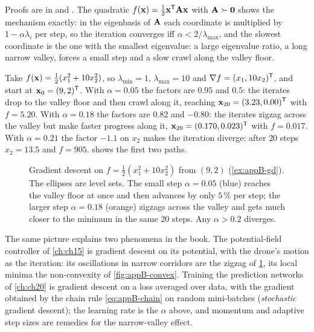 Proofs are in \textcite[Chapter~9]{boyd2004convex} and
\textcite[Chapter~3]{nocedal2006numerical}. The quadratic $f(\mathbf{x}) =
\tfrac12\mathbf{x}^{\mathsf{T}}\mathbf{A}\mathbf{x}$ with $\mathbf{A} \succ \mathbf{0}$ shows the
mechanism exactly: in the eigenbasis of $\mathbf{A}$ each coordinate is
multiplied by $1 - \alpha\lambda_i$ per step, so the iteration converges iff
$\alpha < 2/\lambda_{\max}$, and the slowest coordinate is the one with the
smallest eigenvalue: a large eigenvalue ratio, a long narrow valley, forces a
small step and a slow crawl along the valley floor.

\begin{example}
\label{ex:appB-gd}
Take $f(\mathbf{x}) = \tfrac12(x_1^2 + 10x_2^2)$, so $\lambda_{\min} = 1$, $\lambda_{\max} = 10$ and $\nabla f = (x_1, 10x_2)^{\mathsf{T}}$, and start at $\mathbf{x}_0 = (9, 2)^{\mathsf{T}}$. With $\alpha = 0.05$ the factors are $0.95$ and $0.5$: the iterates drop to the valley floor and then crawl along it, reaching $\mathbf{x}_{20} = (3.23, 0.00)^{\mathsf{T}}$ with $f = 5.20$. With $\alpha = 0.18$ the factors are $0.82$ and $-0.80$: the iterates zigzag across the valley but make faster progress along it, $\mathbf{x}_{20} = (0.170, 0.023)^{\mathsf{T}}$ with $f = 0.017$. With $\alpha = 0.21$ the factor $-1.1$ on $x_2$ makes the iteration diverge: after $20$ steps $x_2 = 13.5$ and $f = 905$.  shows the first two paths.
\end{example}

\begin{figure}[tb]
  \centering
  \caption{Gradient descent on $f = \tfrac12(x_1^2 + 10x_2^2)$ from $(9, 2)$ (\cref{ex:appB-gd}). The ellipses are level sets. The small step $\alpha = 0.05$ (blue) reaches the valley floor at once and then advances by only $5\,\%$ per step; the larger step $\alpha = 0.18$ (orange) zigzags across the valley and gets much closer to the minimum in the same $20$ steps. Any $\alpha > 0.2$ diverges.}
  \label{fig:appB-gd}
\end{figure}

The same picture explains two phenomena in the book. The potential-field
controller of \cref{ch:ch15} is gradient descent on its potential, with the
drone's motion as the iteration: its oscillations in narrow corridors are the
zigzag of \cref{fig:appB-gd}, its local minima the non-convexity of
\cref{fig:appB-convex}. Training the prediction networks of \cref{ch:ch20} is
gradient descent on a loss averaged over data, with the gradient obtained by
the chain rule \cref{eq:appB-chain} on random mini-batches (\emph{stochastic}
gradient descent); the learning rate is the $\alpha$ above, and momentum and
adaptive step sizes are remedies for the narrow-valley effect.


